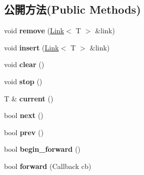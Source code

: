 \subsection*{公開方法(Public Methods)}
\begin{DoxyCompactItemize}
\item 
void {\bfseries remove} (\hyperlink{class_i_dream_sky_1_1_link}{Link}$<$ T $>$ \&link)\hypertarget{class_i_dream_sky_1_1_post_a7d643665b226c0e863379a36119d4f1f}{}\label{class_i_dream_sky_1_1_post_a7d643665b226c0e863379a36119d4f1f}

\item 
void {\bfseries insert} (\hyperlink{class_i_dream_sky_1_1_link}{Link}$<$ T $>$ \&link)\hypertarget{class_i_dream_sky_1_1_post_adf8cec23f583db603e9a3d470c3753cd}{}\label{class_i_dream_sky_1_1_post_adf8cec23f583db603e9a3d470c3753cd}

\item 
void {\bfseries clear} ()\hypertarget{class_i_dream_sky_1_1_post_acb0af222d50c215642aba6373b8b9519}{}\label{class_i_dream_sky_1_1_post_acb0af222d50c215642aba6373b8b9519}

\item 
void {\bfseries stop} ()\hypertarget{class_i_dream_sky_1_1_post_ad00c5214855c5a43c16d64d5073bc7c4}{}\label{class_i_dream_sky_1_1_post_ad00c5214855c5a43c16d64d5073bc7c4}

\item 
T \& {\bfseries current} ()\hypertarget{class_i_dream_sky_1_1_post_a032523b90522807b2a4d31beace2e53d}{}\label{class_i_dream_sky_1_1_post_a032523b90522807b2a4d31beace2e53d}

\item 
bool {\bfseries next} ()\hypertarget{class_i_dream_sky_1_1_post_a4cfe70442c71a16766b6ef2b88bd99a9}{}\label{class_i_dream_sky_1_1_post_a4cfe70442c71a16766b6ef2b88bd99a9}

\item 
bool {\bfseries prev} ()\hypertarget{class_i_dream_sky_1_1_post_a576f7b0bc71ada45eb16f93dd7c74237}{}\label{class_i_dream_sky_1_1_post_a576f7b0bc71ada45eb16f93dd7c74237}

\item 
bool {\bfseries begin\+\_\+forward} ()\hypertarget{class_i_dream_sky_1_1_post_a9d1d508eea9f0b19763808c716ffb8c7}{}\label{class_i_dream_sky_1_1_post_a9d1d508eea9f0b19763808c716ffb8c7}

\item 
bool {\bfseries forward} (Callback cb)\hypertarget{class_i_dream_sky_1_1_post_a18e94e49fdfe0da6efa94043e0cef86a}{}\label{class_i_dream_sky_1_1_post_a18e94e49fdfe0da6efa94043e0cef86a}


\end{DoxyCompactItemize}
